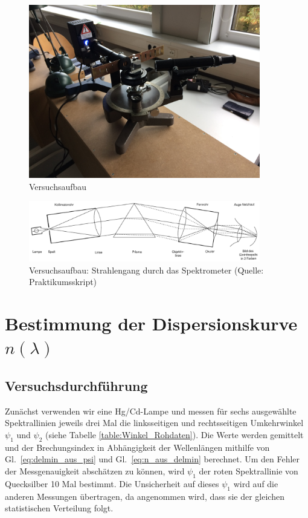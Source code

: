 \documentclass[12pt,a4paper]{article}
\begin{document}
\begin{figure}[H]
	\centering
	\includegraphics[width=0.9\textwidth]{Aufbau_Foto.jpg}
	\caption{Versuchsaufbau}
	\label{Aufbau_Foto}
\end{figure}
\begin{figure}[H]
	\centering
	\includegraphics[width=0.9\textwidth]{Spektrometer_Aufbau.png}
	\caption{Versuchsaufbau: Strahlengang durch das Spektrometer (Quelle: Praktikumsskript)}
	\label{Spektrometer_Aufbau}
\end{figure}

\section{Bestimmung der Dispersionskurve $n(\lambda)$}

\subsection{Versuchsdurchführung}

Zunächst verwenden wir eine Hg/Cd-Lampe und messen für sechs ausgewählte Spektrallinien  jeweils drei Mal die linksseitigen und rechtsseitigen Umkehrwinkel $\psi_1$ und $\psi_2$ (siehe Tabelle \ref{table:Winkel_Rohdaten}). Die Werte werden gemittelt und der Brechungsindex in Abhängigkeit der Wellenlängen mithilfe von Gl.~\eqref{eq:delmin_aus_psi} und Gl.~\eqref{eq:n_aus_delmin} berechnet. Um den Fehler der Messgenauigkeit abschätzen zu können, wird $\psi_1$ der roten Spektrallinie von Quecksilber 10 Mal bestimmt. Die Unsicherheit auf dieses $\psi_1$ wird auf die anderen Messungen übertragen, da angenommen wird, dass sie der gleichen statistischen Verteilung folgt.
\end{document}
